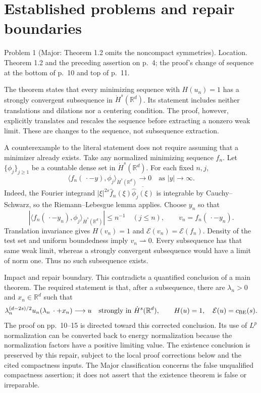 \documentclass[10pt]{article}
\begin{document}
\section*{Established problems and repair boundaries}
Problem 1 (Major: Theorem 1.2 omits the noncompact symmetries).  Location. Theorem 1.2 and the preceding assertion on p. 4; the proof’s change of sequence at the bottom of p. 10 and top of p. 11.\par
The theorem states that every minimizing sequence with \(H(u_n)=1\) has a strongly convergent subsequence in \(\dot H^s(\mathbb R^d)\). Its statement includes neither translations and dilations nor a centering condition. The proof, however, explicitly translates and rescales the sequence before extracting a nonzero weak limit. These are changes to the sequence, not subsequence extraction.\par
A counterexample to the literal statement does not require assuming that a minimizer already exists. Take any normalized minimizing sequence \(f_n\). Let \(\{\phi_j\}_{j\ge1}\) be a countable dense set in \(\dot H^s(\mathbb R^d)\). For each fixed \(n,j\), \[\langle f_n(\,\cdot-y),\phi_j\rangle_{\dot H^s(\mathbb R^d)}\longrightarrow0
 \quad\text{as }|y|\longrightarrow\infty.\] Indeed, the Fourier integrand \(\lvert\xi\rvert^{2s}\widehat f_n(\xi)\overline{\widehat\phi_j(\xi)}\) is integrable by Cauchy–Schwarz, so the Riemann–Lebesgue lemma applies. Choose \(y_n\) so that \[|\langle f_n(\,\cdot-y_n),\phi_j\rangle_{\dot H^s(\mathbb R^d)}|\le n^{-1}
 \quad (j\le n),
 \qquad v_n=f_n(\,\cdot-y_n).\] Translation invariance gives \(H(v_n)=1\) and \(\mathcal E(v_n)=\mathcal E(f_n)\). Density of the test set and uniform boundedness imply \(v_n\rightharpoonup0\). Every subsequence has that same weak limit, whereas a strongly convergent subsequence would have a limit of norm one. Thus no such subsequence exists.\par
Impact and repair boundary. This contradicts a quantified conclusion of a main theorem. The required statement is that, after a subsequence, there are \(\lambda_n>0\) and \(x_n\in\mathbb R^d\) such that \[\lambda_n^{(d-2s)/2}u_n(\lambda_n\,\cdot+x_n)\longrightarrow u
 \quad\text{strongly in }\dot H^s(\mathbb R^d),\qquad H(u)=1,\quad \mathcal E(u)=c_{\rm BE}(s).\] The proof on pp. 10–15 is directed toward this corrected conclusion. Its use of \(L^p\) normalization can be converted back to energy normalization because the normalization factors have a positive limiting value. The existence conclusion is preserved by this repair, subject to the local proof corrections below and the cited compactness inputs. The Major classification concerns the false unqualified compactness assertion; it does not assert that the existence theorem is false or irreparable.\par
\end{document}
